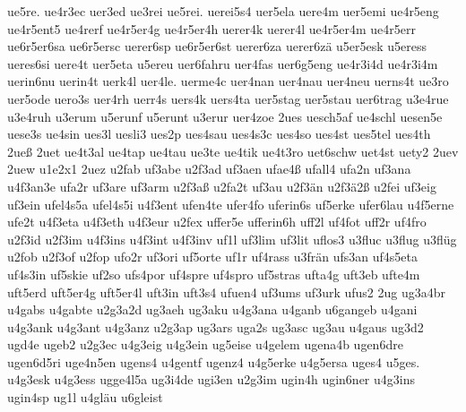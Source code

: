 {    ue5re.
    ue4r3ec
    uer3ed
    ue3rei
    ue5rei.
    uerei5s4
    uer5ela
    uere4m
    uer5emi
    ue4r5eng
    ue4r5ent5
    ue4rerf
    ue4r5er4g
    ue4r5er4h
    uerer4k
    uerer4l
    ue4r5er4m
    ue4r5err
    ue6r5er6sa
    ue6r5ersc
    uerer6sp
    ue6r5er6st
    uerer6za
    uerer6zä
    u5er5esk
    u5eress
    ueres6si
    uere4t
    uer5eta
    u5ereu
    uer6fahru
    uer4fas
    uer6g5eng
    ue4r3i4d
    ue4r3i4m
    uerin6nu
    uerin4t
    uerk4l
    uer4le.
    uerme4c
    uer4nan
    uer4nau
    uer4neu
    uerns4t
    ue3ro
    uer5ode
    uero3s
    uer4rh
    uerr4s
    uers4k
    uers4ta
    uer5stag
    uer5stau
    uer6trag
    u3e4rue
    u3e4ruh
    u3erum
    u5erunf
    u5erunt
    u3erur
    uer4zoe
    2ues
    uesch5af
    ue4schl
    uesen5e
    uese3s
    ue4sin
    ues3l
    uesli3
    ues2p
    ues4sau
    ues4s3c
    ues4so
    ues4st
    ues5tel
    ues4th
    2ueß
    2uet
    ue4t3al
    ue4tap
    ue4tau
    ue3te
    ue4tik
    ue4t3ro
    uet6schw
    uet4st
    uety2
    2uev
    2uew
    u1e2x1
    2uez
    u2fab
    uf3abe
    u2f3ad
    uf3aen
    ufae4ß
    ufall4
    ufa2n
    uf3ana
    u4f3an3e
    ufa2r
    uf3are
    uf3arm
    u2f3aß
    u2fa2t
    uf3au
    u2f3än
    u2f3ä2ß
    u2fei
    uf3eig
    uf3ein
    ufel4s5a
    ufel4s5i
    u4f3ent
    ufen4te
    ufer4fo
    uferin6s
    uf5erke
    ufer6lau
    u4f5erne
    ufe2t
    u4f3eta
    u4f3eth
    u4f3eur
    u2fex
    uffer5e
    ufferin6h
    uff2l
    uf4fot
    uff2r
    uf4fro
    u2f3id
    u2f3im
    u4f3ins
    u4f3int
    u4f3inv
    uf1l
    uf3lim
    uf3lit
    uflos3
    u3fluc
    u3flug
    u3flüg
    u2fob
    u2f3of
    u2fop
    ufo2r
    uf3ori
    uf5orte
    uf1r
    uf4rass
    u3frän
    ufs3an
    uf4s5eta
    uf4s3in
    uf5skie
    uf2so
    ufs4por
    uf4spre
    uf4spro
    uf5stras
    ufta4g
    uft3eb
    ufte4m
    uft5erd
    uft5er4g
    uft5er4l
    uft3in
    uft3s4
    ufuen4
    uf3ums
    uf3urk
    ufus2
    2ug
    ug3a4br
    u4gabs
    u4gabte
    u2g3a2d
    ug3aeh
    ug3aku
    u4g3ana
    u4ganb
    u6gangeb
    u4gani
    u4g3ank
    u4g3ant
    u4g3anz
    u2g3ap
    ug3ars
    uga2s
    ug3asc
    ug3au
    u4gaus
    ug3d2
    ugd4e
    ugeb2
    u2g3ec
    u4g3eig
    u4g3ein
    ug5eise
    u4gelem
    ugena4b
    ugen6dre
    ugen6d5ri
    uge4n5en
    ugens4
    u4gentf
    ugenz4
    u4g5erke
    u4g5ersa
    uges4
    u5ges.
    u4g3esk
    u4g3ess
    ugge4l5a
    ug3i4de
    ugi3en
    u2g3im
    ugin4h
    ugin6ner
    u4g3ins
    ugin4sp
    ug1l
    u4gläu
    u6gleist
}
